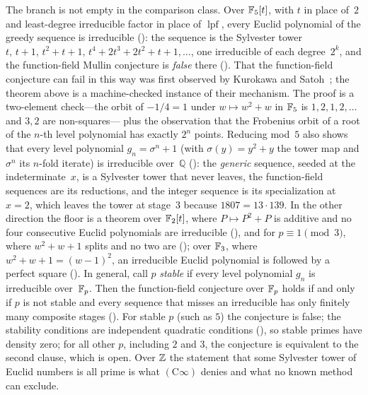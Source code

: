 \documentclass[10pt,a4paper]{article}
\newcommand{\lpf}{\operatorname{lpf}}
\newcommand{\Cinf}{(\mathrm{C}\infty)}
\begin{document}
The branch is not empty in the comparison class.  Over $\mathbb{F}_5[t]$, with
$t$ in place of~$2$ and least-degree irreducible factor in place of
$\lpf$, every Euclid polynomial of the greedy sequence is irreducible
():
the sequence is the Sylvester tower $t,\,t+1,\,t^2+t+1,\,
t^4+2t^3+2t^2+t+1,\dots$, one irreducible of each degree~$2^k$, and the
function-field Mullin conjecture is \emph{false} there
().
That the function-field conjecture can fail in this way was first observed
by Kurokawa and Satoh~\cite{KuSa2008}; the theorem above is a
machine-checked instance of their mechanism.
The proof is a two-element check---the orbit of $-1/4=1$ under
$w\mapsto w^2+w$ in $\mathbb{F}_5$ is $1,2,1,2,\dots$ and $3,2$ are non-squares---
plus the observation that the Frobenius orbit of a root of the $n$-th level
polynomial has exactly $2^n$ points.  Reducing mod~$5$ also shows that
every level polynomial $g_n=\sigma^{n}+1$ (with $\sigma(y)=y^2+y$ the tower
map and $\sigma^{n}$ its $n$-fold iterate) is irreducible over~$\mathbb{Q}$
(): the
\emph{generic} sequence, seeded at the indeterminate~$x$, is a Sylvester
tower that never leaves, the function-field sequences are its reductions,
and the integer sequence is its specialization at $x=2$, which leaves the
tower at stage~$3$ because $1807 = 13\cdot139$.  In the other direction
the floor is a theorem over $\mathbb{F}_2[t]$, where $P\mapsto P^2+P$ is additive
and no four consecutive Euclid polynomials are irreducible
(),
and for $p\equiv1\pmod 3$, where $w^2+w+1$ splits and no two are
();
over $\mathbb{F}_3$, where $w^2+w+1=(w-1)^2$, an irreducible Euclid polynomial is
followed by a perfect square
().
In general, call $p$ \emph{stable} if every level polynomial $g_n$ is
irreducible over~$\mathbb{F}_p$.  Then the function-field conjecture over
$\mathbb{F}_p$ holds if and only if $p$ is not stable and every sequence that
misses an irreducible has only finitely many composite stages
().
For stable $p$ (such as $5$) the conjecture is false; the stability
conditions are independent quadratic conditions
(),
so stable primes have density zero; for all other $p$, including $2$ and
$3$, the conjecture is equivalent to the second clause, which is open.
Over $\mathbb{Z}$ the statement that some Sylvester tower of Euclid numbers is
all prime is what $\Cinf$ denies and what no known method can exclude.
\end{document}
